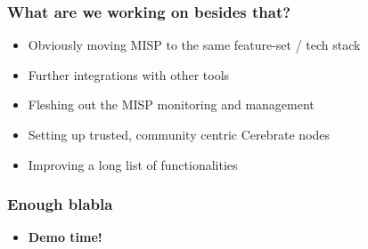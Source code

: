 \begin{frame}
	\frametitle{What are we working on besides that?}
	\begin{itemize}
                \item Obviously moving MISP to the same feature-set / tech stack
                \item Further integrations with other tools
                \item Fleshing out the MISP monitoring and management
                \item Setting up trusted, community centric Cerebrate nodes
                \item Improving a long list of functionalities
	\end{itemize}
\end{frame}

\begin{frame}
	\frametitle{Enough blabla}
	\begin{itemize}
                \item {\bf Demo time!}
	\end{itemize}
\end{frame}
